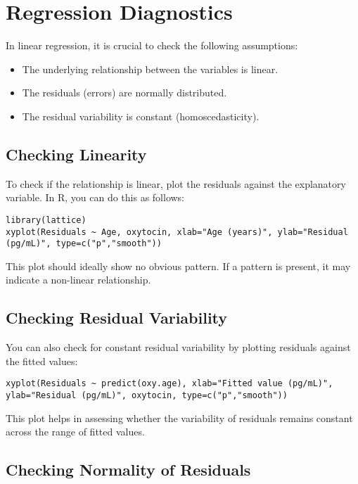 \documentclass{article}
\begin{document}
\section{Regression Diagnostics}

In linear regression, it is crucial to check the following assumptions:
\begin{itemize}
    \item The underlying relationship between the variables is linear.
    \item The residuals (errors) are normally distributed.
    \item The residual variability is constant (homoscedasticity).
\end{itemize}

\subsection{Checking Linearity}

To check if the relationship is linear, plot the residuals against the explanatory variable. In R, you can do this as follows:

\begin{verbatim}
library(lattice)
xyplot(Residuals ~ Age, oxytocin, xlab="Age (years)", ylab="Residual (pg/mL)", type=c("p","smooth"))
\end{verbatim}

This plot should ideally show no obvious pattern. If a pattern is present, it may indicate a non-linear relationship.

\subsection{Checking Residual Variability}

You can also check for constant residual variability by plotting residuals against the fitted values:

\begin{verbatim}
xyplot(Residuals ~ predict(oxy.age), xlab="Fitted value (pg/mL)", ylab="Residual (pg/mL)", oxytocin, type=c("p","smooth"))
\end{verbatim}

This plot helps in assessing whether the variability of residuals remains constant across the range of fitted values.

\subsection{Checking Normality of Residuals}
\end{document}
